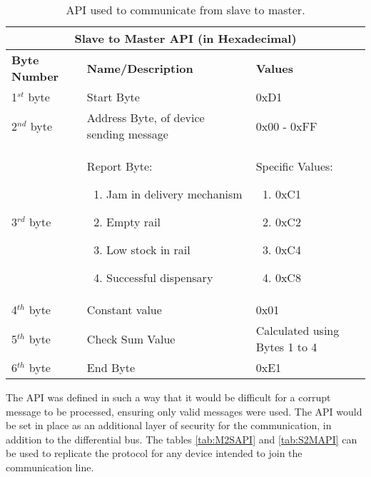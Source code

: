 \documentclass[a4paper,11pt]{article}
\numberwithin{figure}{section}
\numberwithin{table}{section}
\begin{document}
	\begin{center}
		\begin{table}[ht]
			\centering
			\begin{tabular}{| m{3cm} | m{5cm}| m{5cm} |}
			\hline
			\multicolumn{3}{|c|}{\bfseries Slave to Master API (in Hexadecimal)}\\
			\hline
			\bfseries{Byte Number}  & \bfseries{Name/Description} & \bfseries{Values} \\
			\hline
			1$^{st}$ byte & Start Byte & 0xD1\\
			\hline
			2$^{nd}$ byte & Address Byte, of device sending message & 0x00 - 0xFF\\
			\hline
			3$^{rd}$ byte & Report Byte:\begin{enumerate}
											\setlength{\itemsep}{0pt}
   											\setlength{\parskip}{0pt}
    										\setlength{\parsep}{0pt} 
											\item Jam in delivery mechanism
											\item Empty rail
											\item Low stock in rail
											\item Successful dispensary
										\end{enumerate} & Specific Values: \begin{enumerate}[noitemsep,topsep=0pt]
																				\setlength{\itemsep}{0pt}
   																				\setlength{\parskip}{0pt}
    																			\setlength{\parsep}{0pt} 
																				\item 0xC1
																				\item 0xC2
																				\item 0xC4
																				\item 0xC8
																			\end{enumerate}\\
			\hline
			4$^{th}$ byte & Constant value & 0x01 \\
			\hline
			5$^{th}$ byte & Check Sum Value & Calculated using Bytes 1 to 4\\
			\hline
			6$^{th}$ byte & End Byte & 0xE1 \\
			\hline
			\end{tabular}
		\caption{API used to communicate from slave to master. \label{tab:S2MAPI}}
		\end{table}
	\end{center}

The API was defined in such a way that it would be difficult for a corrupt message to be processed, ensuring only valid messages were used. The API would be set in place as an additional layer of security for the communication, in addition to the differential bus. The tables \autoref{tab:M2SAPI} and \autoref{tab:S2MAPI} can be used to replicate the protocol for any device intended to join the communication line.
\end{document}
